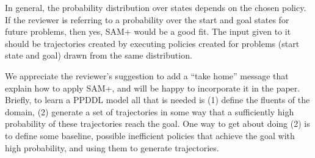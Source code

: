 \documentclass[letterpaper]{article} %
\begin{document}
\begin{compactenum}
\item In general, the probability distribution over states depends on the chosen policy. If the reviewer is referring to a probability over the start and goal states for future problems, then yes, SAM+ would be a good fit. The input given to it should be trajectories created by executing policies created for problems (start state and goal) drawn from the same distribution.   


 \item We appreciate the reviewer's suggestion to add a ``take home'' message that explain how to apply SAM+, and will be happy to incorporate it in the paper. Briefly, to learn a PPDDL model all that is needed is (1) define the fluents of the domain, (2) generate a set of trajectories in some way that a sufficiently high probability of these trajectories reach the goal. One way to get about doing (2) is to define some baseline, possible inefficient policies that achieve the goal with high probability, and using them to generate trajectories.
   
\end{compactenum}
\end{document}
